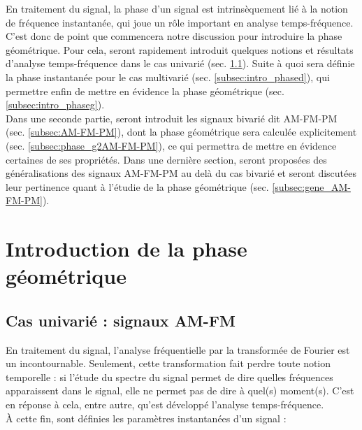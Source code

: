 
En traitement du signal, la phase d'un signal est intrinsèquement lié à la notion de fréquence instantanée, qui joue un rôle important en analyse temps-fréquence. 
C'est donc de point que commencera notre discussion pour introduire la phase géométrique.
Pour cela, seront rapidement introduit quelques notions et résultats d'analyse temps-fréquence dans le cas univarié (sec. \ref{subsec:ana_temp-freq}). Suite à quoi sera définie la phase instantanée pour le cas multivarié (sec. \ref{subsec:intro_phased}), qui permettre enfin de mettre en évidence la phase géométrique (sec. \ref{subsec:intro_phaseg}).
\\

Dans une seconde partie, seront introduit les signaux bivarié dit AM-FM-PM  (sec. \ref{subsec:AM-FM-PM}), dont la phase géométrique sera calculée explicitement (sec. \ref{subsec:phase_g2AM-FM-PM}), ce qui permettra de mettre en évidence certaines de ses propriétés. Dans une dernière section, seront proposées des généralisations des signaux AM-FM-PM au delà du cas bivarié et seront discutées leur pertinence quant à l'étudie de la phase géométrique (sec. \ref{subsec:gene_AM-FM-PM}). 

\section{Introduction de la phase géométrique} \label{sec:intro_phaseg}

\subsection{Cas univarié : signaux AM-FM} \label{subsec:ana_temp-freq}


En traitement du signal, l'analyse fréquentielle par la transformée de Fourier est un incontournable. 
Seulement, cette transformation fait perdre toute notion temporelle : si l'étude du spectre du signal permet de dire quelles fréquences apparaissent dans le signal, elle ne permet pas de dire à quel(s) moment(s). 
C'est en réponse à cela, entre autre, qu'est développé l'analyse temps-fréquence. 
\\
À cette fin, sont définies les paramètres instantanées d'un signal :\par

